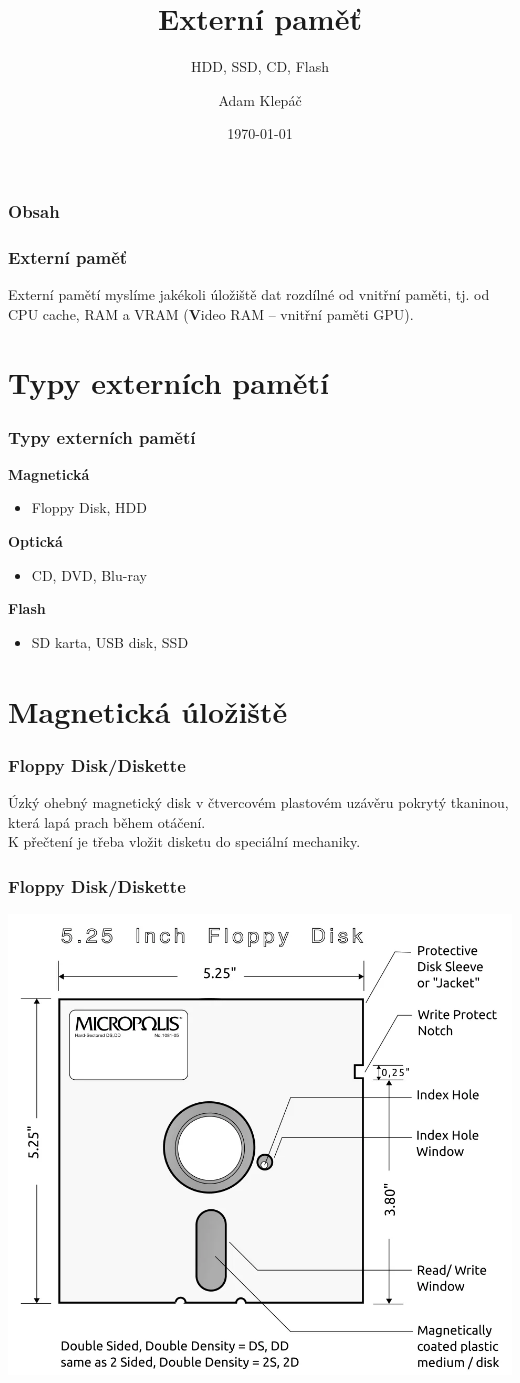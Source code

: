 \documentclass[aspectratio=169,11pt,svgnames,handout]{beamer}
\title{Externí paměť}
\subtitle{HDD, SSD, CD, Flash}
\date{\today}
\author{Adam Klepáč}
\institute[GEVO]{Gymnázium Evolution Jižní Město}
\begin{document}
\titleframe

\begin{frame}
 \frametitle{Obsah}
 \tableofcontents
\end{frame}

\begin{frame}
 \frametitle{Externí paměť}
 \begin{tcolorbox}[title=Co je externí paměť]
  Externí pamětí myslíme jakékoli úložiště dat rozdílné od vnitřní paměti, tj.
  od CPU cache, RAM a VRAM (\textbf{V}ideo RAM -- vnitřní paměti GPU).
 \end{tcolorbox}
\end{frame}

\section{Typy externích pamětí}

\begin{frame}
 \frametitle{Typy externích pamětí}
 \textbf{Magnetická}
 \begin{itemize}[label=\textbullet]
  \item Floppy Disk, HDD
 \end{itemize}
 \pause
 \textbf{Optická}
 \begin{itemize}[label=\textbullet]
  \item CD, DVD, Blu-ray
 \end{itemize}
 \pause
 \textbf{Flash}
 \begin{itemize}[label=\textbullet]
  \item SD karta, USB disk, SSD
 \end{itemize}
\end{frame}

\section{Magnetická úložiště}

\begin{frame}
 \frametitle{Floppy Disk/Diskette}
 Úzký ohebný magnetický disk v čtvercovém plastovém uzávěru pokrytý tkaninou,
 která lapá prach během otáčení.\\
 \pause
 K přečtení je třeba vložit disketu do speciální mechaniky.
\end{frame}

\begin{frame}
 \frametitle{Floppy Disk/Diskette}
 \begin{center}
  \includegraphics[width=.5\textwidth]{floppy}
 \end{center}
\end{frame}
\end{document}
